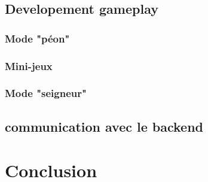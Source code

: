 \documentclass[french,a4paper,10pt]{article}
\begin{document}
    \subsection{Developement gameplay}
        \subsubsection{Mode "péon"}
        \subsubsection{Mini-jeux}
        \subsubsection{Mode "seigneur"}
        
    \subsection{communication avec le backend}

\section{Conclusion}
\end{document}

